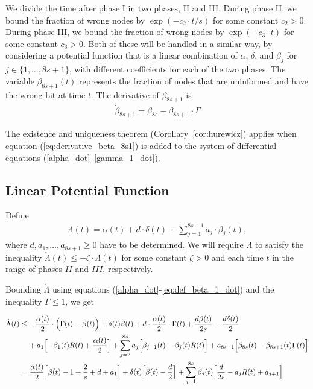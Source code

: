 \documentclass[a4paper,12pt]{article}
\begin{document}
We divide the time after phase I in two phases, II and III. During phase II, we bound the fraction of wrong nodes by $\exp(-c_2 \cdot t/s)$ for some constant $c_2 > 0$. During phase III, we bound the fraction of wrong nodes by $\exp(-c_3 \cdot t)$ for some constant $c_3 > 0$.
Both of these will be handled in a similar way, by considering a potential function that is a linear combination of $\alpha$, $\delta$, and $\beta_j$ for $j \in \{1, \ldots, 8s+1\}$, with different coefficients for each of the two phases. The variable $\beta_{8s+1}(t)$ represents the fraction of nodes that are uninformed and have the wrong bit at time $t$. The derivative of $\beta_{8s+1}$ is
\begin{align} \label{eq:derivative_beta_8s1}
\dot{\beta}_{8s+1} = \beta_{8s} - \beta_{8s+1}\cdot \Gamma
\end{align}

The existence and uniqueness theorem (Corollary~\ref{cor:hurewicz}) applies when equation (\ref{eq:derivative_beta_8s1}) is added to the system of differential equations (\ref{alpha_dot}--\ref{gamma_1_dot}).

\subsection{Linear Potential Function}

Define
\begin{align} \label{def:Lambda}
\Lambda(t) = \alpha(t) + d \cdot \delta(t) + \sum_{j=1}^{8s+1} a_j \cdot \beta_j(t),
\end{align}
where $d, a_1, \ldots, a_{8s+1} \geq 0 $ have to be determined. We will require $\Lambda$ to satisfy the inequality $\dot{\Lambda}(t) \leq -\zeta \cdot \Lambda(t)$ for some constant $\zeta > 0$ and each time $t$ in the range of phases $II$ and $III$, respectively.

Bounding $\dot{\Lambda}$ using equations (\ref{alpha_dot}-\ref{eq:def_beta_1_dot}) and the inequality $\Gamma \leq 1$, we get
\begin{small}
\begin{align} %
\dot{\Lambda}(t) & \leq - \frac{\alpha(t)}{2} \cdot \Bigl(\Gamma(t) - \beta(t)\Bigr) + \delta(t) \beta(t) + d \cdot \frac{\alpha(t)}{2} \cdot \Gamma(t) + \frac{ d \beta(t)}{2s} - \frac{d \delta(t)}{2}  \notag \\
& \; \; \; \; + a_1  \Bigl[ -\beta_1(t)  R(t) + \frac{\alpha(t)}{2} \Bigr] + \sum_{j=2}^{8s} a_j  \Bigl[\beta_{j-1}(t) - \beta_j(t)  R(t) \Bigr] + a_{8s+1}   \Bigl[\beta_{8s}(t) - \beta_{8s+1}(t) \Gamma(t) \Bigr] \notag \\
& = \frac{\alpha(t)}{2}  \Bigl[ {\beta(t)} - 1 + \frac{2}{s} + {d} + {a_1} \Bigr] + \delta(t)  \Bigl[ \beta(t) - \frac{d}{2} \Bigr] + \sum_{j=1}^{8s} \beta_j(t)  \Bigl[\frac{d}{2s} - a_j  R(t) + a_{j+1} \Bigr] \notag
\end{align}
\end{small}
\end{document}
